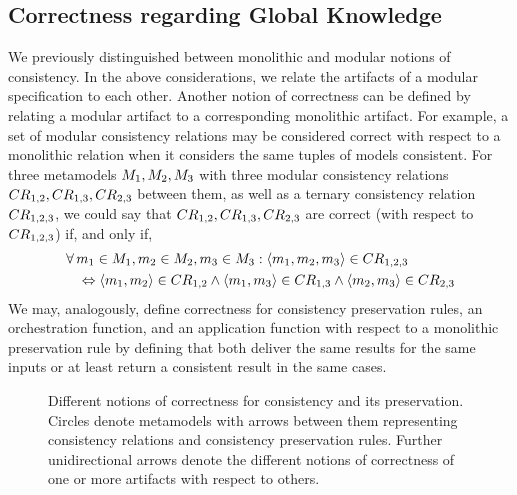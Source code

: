 \subsection{Correctness regarding Global Knowledge}

We previously distinguished between monolithic and modular notions of consistency.
In the above considerations, we relate the artifacts of a modular specification to each other.
Another notion of correctness can be defined by relating a modular artifact to a corresponding monolithic artifact.
For example, a set of modular consistency relations may be considered correct with respect to a monolithic relation when it considers the same tuples of models consistent.
For three metamodels $\metamodel{M}{1}, \metamodel{M}{2}, \metamodel{M}{3}$ with three modular consistency relations $\consistencyrelation{CR}{1,2}, \consistencyrelation{CR}{1,3}, \consistencyrelation{CR}{2,3}$ between them, as well as a ternary consistency relation $\consistencyrelation{CR}{1,2,3}$, we could say that $\consistencyrelation{CR}{1,2}, \consistencyrelation{CR}{1,3}, \consistencyrelation{CR}{2,3}$ are correct (with respect to $\consistencyrelation{CR}{1,2,3}$) if, and only if,
\begin{align*}
    & \forall \model{m}{1} \in \metamodel{M}{1}, \model{m}{2} \in \metamodel{M}{2}, \model{m}{3} \in \metamodel{M}{3}: \tupled{\model{m}{1}, \model{m}{2}, \model{m}{3}} \in \consistencyrelation{CR}{1,2,3} \\
    & \formulaskip
    \equivalent \tupled{\model{m}{1}, \model{m}{2}} \in \consistencyrelation{CR}{1,2} \land \tupled{\model{m}{1}, \model{m}{3}} \in \consistencyrelation{CR}{1,3} \land \tupled{\model{m}{2}, \model{m}{3}} \in \consistencyrelation{CR}{2,3}
\end{align*}
%
We may, analogously, define correctness for consistency preservation rules, an orchestration function, and an application function with respect to a monolithic preservation rule by defining that both deliver the same results for the same inputs or at least return a consistent result in the same cases.

\begin{figure}
    \centering
    
    \caption[Notions of correctness for consistency and its preservation]{Different notions of correctness for consistency and its preservation. Circles denote metamodels with arrows between them representing consistency relations and consistency preservation rules. Further unidirectional arrows denote the different notions of correctness of one or more artifacts with respect to others.}
    \label{fig:correctness:correctness_notions}
\end{figure}



